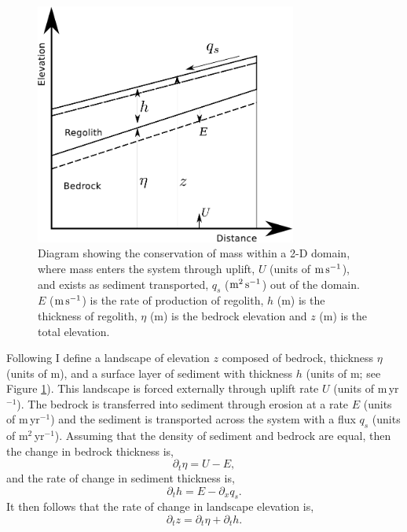 \begin{figure}
\centering
\includegraphics[width=8.6cm]{./figures/ch2-erosion-diagram.pdf}
\caption{Diagram showing the conservation of mass within a 2-D domain, where mass enters the system through uplift, $U$ (units of $\rm m\,s^{-1}$), and exists as sediment transported, $q_{s}$ ($\rm m^{2}\,s^{-1}$) out of the domain. $E$ ($\rm m\,s^{-1}$) is the rate of production of regolith, $h$ (m) is the thickness of regolith, $\eta$ (m) is the bedrock elevation and $z$ (m) is the total elevation.}
\label{fg:1dmodel}
\end{figure}

Following \cite{dietrich-etal-2003} I define a landscape of elevation $z$ composed of bedrock, thickness $\eta$ (units of m), and a surface layer of sediment with thickness $h$ (units of m; see Figure \ref{fg:1dmodel}). This landscape is forced externally through uplift rate $U$ (units of m\,yr$^{-1}$). The bedrock is transferred into sediment through erosion at a rate $E$ (units of m\,yr$^{-1}$) and the sediment is transported across the system with a flux $q_{s}$ (units of m$^2$\,yr$^{-1}$). Assuming that the density of sediment and bedrock are equal, then the change in bedrock thickness is,
\begin{equation}
\partial_{t}\eta = U - E,
\label{eq:bedrock}
\end{equation}
and the rate of change in sediment thickness is,
\begin{equation}
\partial_{t}h = E - \partial_{x}q_{s}.
\label{eq:sediment}
\end{equation}
It then follows that the rate of change in landscape elevation is,
\begin{equation}
\partial_{t}z = \partial_{t}\eta + \partial_{t}h.
\label{eq:elevation}
\end{equation}

